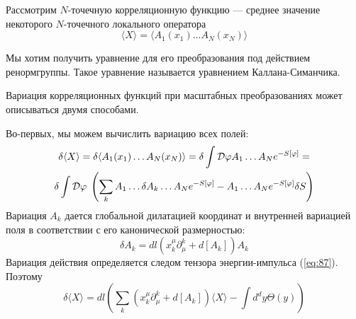 \documentclass[a4paper,12pt]{article}
\theoremstyle{definition}
\theoremstyle{definition}
\theoremstyle{definition}
\begin{document}
Рассмотрим $N$-точечную корреляционную функцию --- среднее значение некоторого $N$-точечного локального оператора
\begin{equation}
  \label{eq:81}
  \langle X\rangle =\langle A_1 (x_1)\dots A_N (x_N)\rangle
\end{equation}

Мы хотим получить уравнение для его преобразования под действием ренормгруппы. Такое уравнение называется уравнением Каллана-Симанчика. 

Вариация корреляционных функций при масштабных преобразованиях может описываться двумя способами.

Во-первых, мы можем вычислить вариацию всех полей:
\begin{multline}
  \label{eq:82}
  \delta \langle X\rangle=\delta \langle A_1(x_1)\dots A_N (x_N)\rangle = \delta \int {\cal D}\varphi A_1 \dots A_N e^{-S[\varphi]} = \\
  \delta \int {\cal D} \varphi\; \left( \sum_k A_1 \dots \delta A_k \dots A_N e^{-S[\varphi]} -A_1\dots A_N e^{-S[\varphi]}\delta S\right)
\end{multline}
Вариация $A_k$ дается глобальной дилатацией координат и внутренней вариацией поля в соответствии с его канонической размерностью:
\begin{equation}
  \label{eq:88}
  \delta A_k=dl (x^{\mu}_k\partial^k_{\mu}+d[A_k]) A_k
\end{equation}
Вариация действия определяется следом тензора энергии-импульса (\ref{eq:87}). Поэтому
\begin{equation}
  \label{eq:89}
  \delta\langle X\rangle=dl \left(\sum_k (x_k^{\mu}\partial_{\mu}^k+d[A_k])\langle X\rangle-\int d^d y \Theta(y)\right)
\end{equation}
\end{document}
